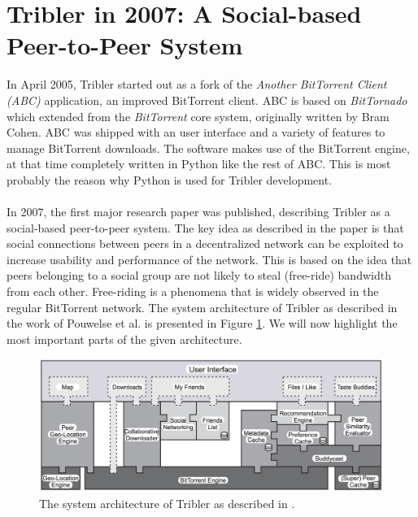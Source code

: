 \section{Tribler in 2007: A Social-based Peer-to-Peer System}
In April 2005, Tribler started out as a fork of the \emph{Another BitTorrent Client (ABC)} application, an improved BitTorrent client. ABC is based on \emph{BitTornado} which extended from the \emph{BitTorrent} core system, originally written by Bram Cohen. ABC was shipped with an user interface and a variety of features to manage BitTorrent downloads. The software makes use of the BitTorrent engine, at that time completely written in Python like the rest of ABC. This is most probably the reason why Python is used for Tribler development.\\\\
In 2007, the first major research paper was published, describing Tribler as a social-based peer-to-peer system\cite{pouwelse2008tribler}. The key idea as described in the paper is that social connections between peers in a decentralized network can be exploited to increase usability and performance of the network. This is based on the idea that peers belonging to a social group are not likely to steal (free-ride) bandwidth from each other. Free-riding is a phenomena that is widely observed in the regular BitTorrent network. The system architecture of Tribler as described in the work of Pouwelse et al. is presented in Figure \ref{fig:tribler-architecture-2008}. We will now highlight the most important parts of the given architecture.

\begin{figure}[t]
	\centering
	\includegraphics[width=1.0\columnwidth]{images/tribler_architecture_2007}
	\caption{The system architecture of Tribler as described in \cite{pouwelse2008tribler}.}
	\label{fig:tribler-architecture-2008}
\end{figure}

